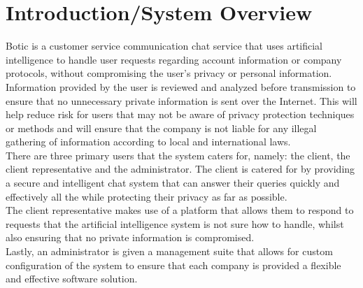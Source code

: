 \documentclass[11pt]{article}
\begin{document}
\section{Introduction/System Overview}
\begin{flushleft}
	Botic is a customer service communication chat service that uses artificial intelligence to handle user requests regarding account information or company protocols, without compromising the user’s privacy or personal information.\\[0.5cm]
	Information provided by the user is reviewed and analyzed before transmission to ensure that no unnecessary private information is sent over the Internet. This will help reduce risk for users that may not be aware of privacy protection techniques or methods and will ensure that the company is not liable for any illegal gathering of information according to local and international laws.\\[0.5cm]
	There are three primary users that the system caters for, namely: the client, the client representative and the administrator.
	The client is catered for by providing a secure and intelligent chat system that can answer their queries quickly and effectively all the while protecting their privacy as far as possible.\\[0.5cm]
	The client representative makes use of a platform that allows them to respond to requests that the artificial intelligence system is not sure how to handle, whilst also ensuring that no private information is compromised.\\[0.5cm]
	Lastly, an administrator is given a management suite that allows for custom configuration of the system to ensure that each company is provided a flexible and effective software solution.\\[0.5cm]
\end{flushleft}
\end{document}
